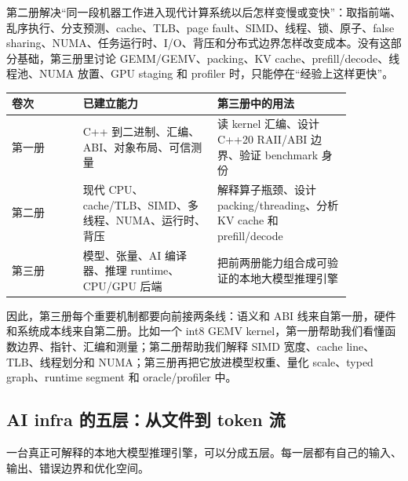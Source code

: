 第二册解决“同一段机器工作进入现代计算系统以后怎样变慢或变快”：取指前端、乱序执行、分支预测、cache、TLB、page fault、SIMD、线程、锁、原子、false sharing、NUMA、任务运行时、I/O、背压和分布式边界怎样改变成本。没有这部分基础，第三册里讨论 GEMM/GEMV、packing、KV cache、prefill/decode、线程池、NUMA 放置、GPU staging 和 profiler 时，只能停在“经验上这样更快”。

\begin{center}
\begin{tabular}{p{0.18\linewidth}p{0.34\linewidth}p{0.34\linewidth}}
\toprule
卷次 & 已建立能力 & 第三册中的用法 \\
\midrule
第一册 & C++ 到二进制、汇编、ABI、对象布局、可信测量 & 读 kernel 汇编、设计 C++20 RAII/ABI 边界、验证 benchmark 身份 \\
第二册 & 现代 CPU、cache/TLB、SIMD、多线程、NUMA、运行时、背压 & 解释算子瓶颈、设计 packing/threading、分析 KV cache 和 prefill/decode \\
第三册 & 模型、张量、AI 编译器、推理 runtime、CPU/GPU 后端 & 把前两册能力组合成可验证的本地大模型推理引擎 \\
\bottomrule
\end{tabular}
\end{center}

因此，第三册每个重要机制都要向前接两条线：语义和 ABI 线来自第一册，硬件和系统成本线来自第二册。比如一个 int8 GEMV kernel，第一册帮助我们看懂函数边界、指针、汇编和测量；第二册帮助我们解释 SIMD 宽度、cache line、TLB、线程划分和 NUMA；第三册再把它放进模型权重、量化 scale、typed graph、runtime segment 和 oracle/profiler 中。

\subsection{AI infra 的五层：从文件到 token 流}

一台真正可解释的本地大模型推理引擎，可以分成五层。每一层都有自己的输入、输出、错误边界和优化空间。

